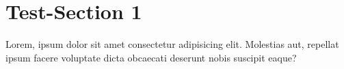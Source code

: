 \section{Test-Section 1} \label{sec:TestSection1}
    Lorem, ipsum dolor sit amet consectetur adipisicing elit. Molestias aut, repellat ipsum facere voluptate dicta obcaecati deserunt nobis suscipit eaque?

    
